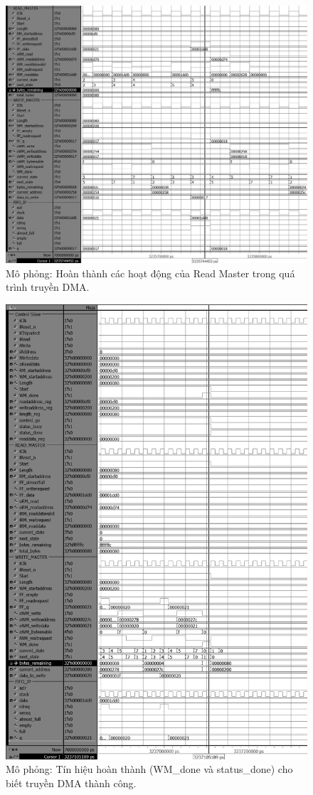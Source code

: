 \begin{figure}[htbp]
    \centering
    \includegraphics[width=\linewidth]{Images/04_05_RM_Done.png}
    \caption{Mô phỏng: Hoàn thành các hoạt động của Read Master trong quá trình truyền DMA.}
    \label{fig:04_05_RM_Done}
\end{figure}

\begin{figure}[htbp]
    \centering
    \includegraphics[width=0.8\linewidth]{Images/04_06_DMA_Done.png}
    \caption{Mô phỏng: Tín hiệu hoàn thành (WM\_done và status\_done) cho biết truyền DMA thành công.}
    \label{fig:04_06_DMA_Done}
\end{figure}

